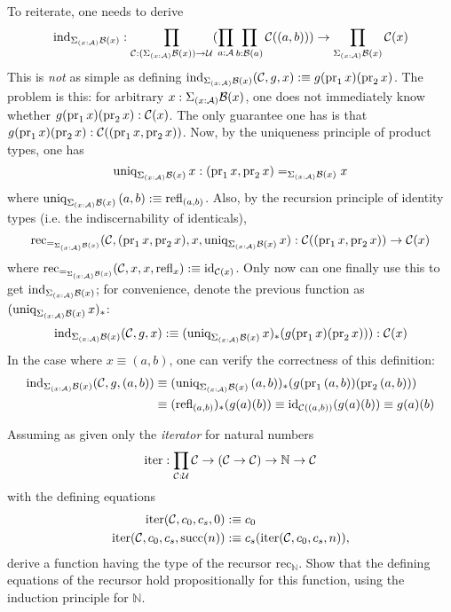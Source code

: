 To reiterate, one needs to derive
\[
	\text{ind}_{\Sigma_{(x : \mathcal{A})}\mathcal{B}(x)} : \prod_{\mathcal{C} : (\Sigma_{(x : \mathcal{A})}\mathcal{B}(x)) \to \mathcal{U}}(\prod_{a : \mathcal{A}}\prod_{b : \mathcal{B}(a)}\mathcal{C}((a,b))) \to \prod_{\Sigma_{(x : \mathcal{A})}\mathcal{B}(x)}\mathcal{C}(x)
\]
This is \textit{not} as simple as defining $\text{ind}_{\Sigma_{(x : \mathcal{A})}\mathcal{B}(x)}(\mathcal{C},g,x) :\equiv g(\text{pr}_1\,x)(\text{pr}_2\,x)$. The problem is this: for arbitrary $x : \Sigma_{(x : \mathcal{A})}\mathcal{B}(x)$, one does not immediately know whether $g(\text{pr}_1\,x)(\text{pr}_2\,x) : \mathcal{C}(x)$. The only guarantee one has is that $g(\text{pr}_1\,x)(\text{pr}_2\,x) : \mathcal{C}((\text{pr}_1\,x,\text{pr}_2\,x))$. Now, by the uniqueness principle of product types, one has
\[
	\text{uniq}_{\Sigma_{(x : \mathcal{A})}\mathcal{B}(x)}\,x : (\text{pr}_1\,x,\text{pr}_2\,x) =_{\Sigma_{(x : \mathcal{A})}\mathcal{B}(x)} x
\]
where $\text{uniq}_{\Sigma_{(x : \mathcal{A})}\mathcal{B}(x)}\,(a,b) :\equiv \text{refl}_{(a,b)}$. Also, by the recursion principle of identity types (i.e. the indiscernability of identicals),
\[
	\text{rec}_{=_{\Sigma_{(x : \mathcal{A})}\mathcal{B}(x)}}(\mathcal{C}, (\text{pr}_1\,x,\text{pr}_2\,x), x, \text{uniq}_{\Sigma_{(x : \mathcal{A})}\mathcal{B}(x)}\,x) : \mathcal{C}((\text{pr}_1\,x,\text{pr}_2\,x)) \to \mathcal{C}(x)
\]
where $\text{rec}_{=_{\Sigma_{(x : \mathcal{A})}\mathcal{B}(x)}}(\mathcal{C},x,x,\text{refl}_x) :\equiv \text{id}_{\mathcal{C}(x)}$. Only now can one finally use this to get $\text{ind}_{\Sigma_{(x : \mathcal{A})}\mathcal{B}(x)}$; for convenience, denote the previous function as $(\text{uniq}_{\Sigma_{(x : \mathcal{A})}\mathcal{B}(x)}\,x)_*$:
\[
\text{ind}_{\Sigma_{(x : \mathcal{A})}\mathcal{B}(x)}(\mathcal{C},g,x) :\equiv (\text{uniq}_{\Sigma_{(x : \mathcal{A})}\mathcal{B}(x)}\,x)_*(g(\text{pr}_1\,x)(\text{pr}_2\,x))) : \mathcal{C}(x)
\]
In the case where $x \equiv (a,b)$, one can verify the correctness of this definition:
\begin{align*}
	\text{ind}_{\Sigma_{(x : \mathcal{A})}\mathcal{B}(x)}(\mathcal{C},g,(a,b)) &\equiv (\text{uniq}_{\Sigma_{(x : \mathcal{A})}\mathcal{B}(x)}\,(a,b))_*(g(\text{pr}_1\,(a,b))(\text{pr}_2\,(a,b)))\\
	&\equiv  (\text{refl}_{(a,b)})_*(g(a)(b)) \equiv  \text{id}_{\mathcal{C}((a,b))}(g(a)(b)) \equiv  g(a)(b)
\end{align*}



 Assuming as given only the \textit{iterator} for natural numbers
\[
	\text{iter} : \prod_{\mathcal{C}:\mathcal{U}} \mathcal{C} \to (\mathcal{C} \to \mathcal{C}) \to \mathbb{N} \to \mathcal{C}
\]
with the defining equations
\begin{align*}
	\text{iter}(\mathcal{C}, c_{0}, c_{s}, 0) &:\equiv c_{0} \\
	\text{iter}(\mathcal{C}, c_{0}, c_{s}, \text{succ}(n)) &:\equiv c_{s}(\text{iter}(\mathcal{C}, c_{0}, c_{s}, n)),
\end{align*}
derive a function having the type of the recursor $\text{rec}_{\mathbb{N}}$. Show that the defining equations of the recursor hold propositionally for this function, using the induction principle for $\mathbb{N}$. \\


